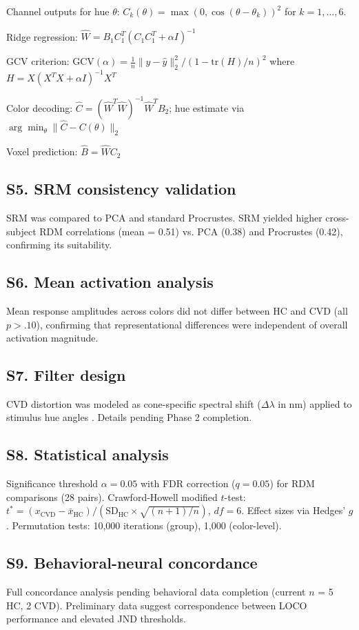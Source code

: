 Channel outputs for hue $\theta$: $C_k(\theta) = \max(0, \cos(\theta - \theta_k))^2$ for $k = 1, \ldots, 6$.

Ridge regression: $\hat{W} = B_1 C_1^T (C_1 C_1^T + \alpha I)^{-1}$

GCV criterion: $\text{GCV}(\alpha) = \frac{1}{n} \|y - \hat{y}\|_2^2 / (1 - \text{tr}(H)/n)^2$ where $H = X(X^T X + \alpha I)^{-1}X^T$

Color decoding: $\hat{C} = (\hat{W}^T \hat{W})^{-1} \hat{W}^T B_2$; hue estimate via $\arg\min_\theta \|\hat{C} - C(\theta)\|_2$

Voxel prediction: $\hat{B} = \hat{W} C_2$

\subsection*{S5. SRM consistency validation}

SRM was compared to PCA and standard Procrustes. SRM yielded higher cross-subject RDM correlations (mean = 0.51) vs. PCA (0.38) and Procrustes (0.42), confirming its suitability.

\subsection*{S6. Mean activation analysis}

Mean response amplitudes across colors did not differ between HC and CVD (all $p > .10$), confirming that representational differences were independent of overall activation magnitude.

\subsection*{S7. Filter design}

CVD distortion was modeled as cone-specific spectral shift ($\Delta\lambda$ in nm) applied to stimulus hue angles \cite{brettel1997}. Details pending Phase 2 completion.

\subsection*{S8. Statistical analysis}

Significance threshold $\alpha = 0.05$ with FDR correction \cite{benjamini1995} ($q = 0.05$) for RDM comparisons (28 pairs). Crawford-Howell modified $t$-test: $t^* = (x_{\text{CVD}} - \bar{x}_{\text{HC}}) / (\text{SD}_{\text{HC}} \times \sqrt{(n+1)/n})$, $df = 6$. Effect sizes via Hedges' $g$. Permutation tests: 10,000 iterations (group), 1,000 (color-level).

\subsection*{S9. Behavioral-neural concordance}

Full concordance analysis pending behavioral data completion (current $n$ = 5 HC, 2 CVD). Preliminary data suggest correspondence between LOCO performance and elevated JND thresholds.

